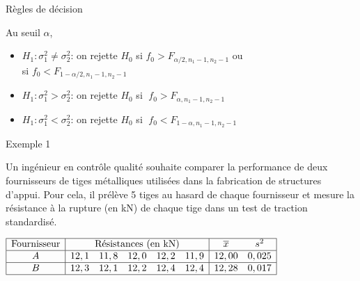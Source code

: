 \documentclass{BeamerTemplate}
\begin{document}
\begin{frame}[t]{Règles de décision}


Au seuil $\alpha$,

\begin{itemize}\itemsep6mm
\item $H_1 : \sigma^2_1 \ne \sigma^2_2$: on rejette $H_0$ si $f_0  > F_{\alpha/2, n_1-1, n_2 -1}$ ou \\ \hspace{4.2cm} si $  f_0  < F_{1-\alpha/2, n_1-1, n_2 -1} $
\item $H_1 : \sigma_1^2 > \sigma^2_2$: on rejette $H_0$ si $\;f_0  > F_{\alpha, n_1-1, n_2 -1}$
\item $H_1 : \sigma_1^2 < \sigma^2_2$: on rejette $H_0$ si $\;f_0  < F_{1-\alpha, n_1-1, n_2 -1}$
\end{itemize}

\end{frame}

\begin{frame}[t]{Exemple 1}



Un ingénieur en contrôle qualité souhaite comparer la performance de deux fournisseurs de tiges métalliques utilisées dans la fabrication de structures d'appui. 
Pour cela, il prélève 5 tiges au hasard de chaque fournisseur et mesure la résistance à la rupture (en kN) de chaque tige dans un test de traction standardisé.\\

\vspace{3mm}

$\begin{array}{|c|lllll|cc|}\hline
\text{Fournisseur} &\multicolumn{5}{c|}{\text{Résistances (en kN)}}&\overline x&s^2\\\hline
A &12,1 & 11,8 & 12,0 & 12,2 & 11,9&12,00 &0,025 \\ \hline
B &12,3 & 12,1 & 12,2 & 12,4 &12,4& 12,28&0,017 \\
\hline
\end{array}$



\end{frame}
\end{document}
